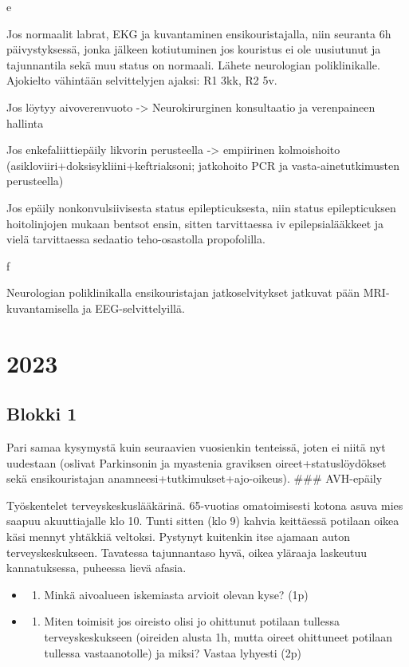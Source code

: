 \documentclass[
]{book}
\providecommand{\tightlist}{%
  \setlength{\itemsep}{0pt}\setlength{\parskip}{0pt}}
\begin{document}
e

Jos normaalit labrat, EKG ja kuvantaminen ensikouristajalla, niin seuranta 6h päivystyksessä, jonka jälkeen kotiutuminen jos kouristus ei ole uusiutunut ja tajunnantila sekä muu status on normaali. Lähete neurologian poliklinikalle. Ajokielto vähintään selvittelyjen ajaksi: R1 3kk, R2 5v.

Jos löytyy aivoverenvuoto -\textgreater{} Neurokirurginen konsultaatio ja verenpaineen hallinta

Jos enkefaliittiepäily likvorin perusteella -\textgreater{} empiirinen kolmoishoito (asikloviiri+doksisykliini+keftriaksoni; jatkohoito PCR ja vasta-ainetutkimusten perusteella)

Jos epäily nonkonvulsiivisesta status epilepticuksesta, niin status epilepticuksen hoitolinjojen mukaan bentsot ensin, sitten tarvittaessa iv epilepsialääkkeet ja vielä tarvittaessa sedaatio teho-osastolla propofolilla.

f

Neurologian poliklinikalla ensikouristajan jatkoselvitykset jatkuvat pään MRI-kuvantamisella ja EEG-selvittelyillä.

\chapter{2023}\label{section-3}

\section{Blokki 1}\label{blokki-1-3}

Pari samaa kysymystä kuin seuraavien vuosienkin tenteissä, joten ei niitä nyt uudestaan (oslivat Parkinsonin ja myastenia graviksen oireet+statuslöydökset sekä ensikouristajan anamneesi+tutkimukset+ajo-oikeus).
\#\#\# AVH-epäily

Työskentelet terveyskeskuslääkärinä. 65-vuotias omatoimisesti kotona asuva mies saapuu akuuttiajalle klo 10. Tunti sitten (klo 9) kahvia keittäessä potilaan oikea käsi mennyt yhtäkkiä veltoksi. Pystynyt kuitenkin itse ajamaan auton terveyskeskukseen. Tavatessa tajunnantaso hyvä, oikea yläraaja laskeutuu kannatuksessa, puheessa lievä afasia.

\begin{itemize}
\tightlist
\item
  \begin{enumerate}
  \def\labelenumi{\alph{enumi}.}
  \tightlist
  \item
    Minkä aivoalueen iskemiasta arvioit olevan kyse? (1p)
  \end{enumerate}
\item
  \begin{enumerate}
  \def\labelenumi{\alph{enumi}.}
  \setcounter{enumi}{1}
  \tightlist
  \item
    Miten toimisit jos oireisto olisi jo ohittunut potilaan tullessa terveyskeskukseen (oireiden alusta 1h, mutta oireet ohittuneet potilaan tullessa vastaanotolle) ja miksi? Vastaa lyhyesti (2p)
  \end{enumerate}
\end{itemize}
\end{document}
